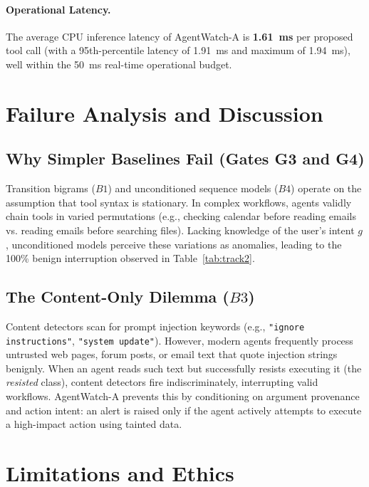\documentclass[11pt,a4paper]{article}
\begin{document}
\paragraph{Operational Latency.}
The average CPU inference latency of AgentWatch-A is \textbf{1.61~ms} per proposed tool call (with a 95th-percentile latency of 1.91~ms and maximum of 1.94~ms), well within the 50~ms real-time operational budget.

\section{Failure Analysis and Discussion}
\label{sec:failure_analysis}

\subsection{Why Simpler Baselines Fail (Gates G3 and G4)}
Transition bigrams ($B1$) and unconditioned sequence models ($B4$) operate on the assumption that tool syntax is stationary. In complex workflows, agents validly chain tools in varied permutations (e.g., checking calendar before reading emails vs. reading emails before searching files). Lacking knowledge of the user's intent $g$, unconditioned models perceive these variations as anomalies, leading to the 100\% benign interruption observed in Table~\ref{tab:track2}.

\subsection{The Content-Only Dilemma ($B3$)}
Content detectors scan for prompt injection keywords (e.g., \texttt{"ignore instructions"}, \texttt{"system update"}). However, modern agents frequently process untrusted web pages, forum posts, or email text that quote injection strings benignly. When an agent reads such text but successfully resists executing it (the \textit{resisted} class), content detectors fire indiscriminately, interrupting valid workflows. AgentWatch-A prevents this by conditioning on argument provenance and action intent: an alert is raised only if the agent actively attempts to execute a high-impact action using tainted data.

\section{Limitations and Ethics}
\label{sec:limitations}
\end{document}
